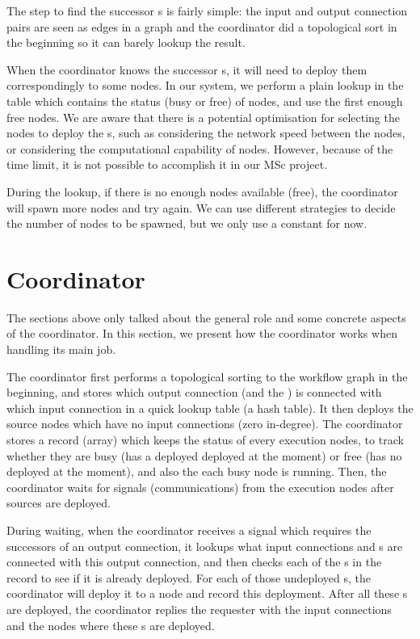 The step to find the successor \tPEInst{}s is fairly simple: the input and output connection pairs are seen as edges in a graph and the coordinator did a topological sort in the beginning so it can barely lookup the result.

When the coordinator knows the successor \tPEInst{}s, it will need to deploy them correspondingly to some nodes. In our system, we perform a plain lookup in the table which contains the status (busy or free) of nodes, and use the first enough free nodes. We are aware that there is a potential optimisation for selecting the nodes to deploy the \tPEInst{}s, such as considering the network speed between the nodes, or considering the computational capability of nodes. However, because of the time limit, it is not possible to accomplish it in our MSc project.

During the lookup, if there is no enough nodes available (free), the coordinator will spawn more nodes and try again. We can use different strategies to decide the number of nodes to be spawned, but we only use a constant for now.

\section{Coordinator}
The sections above only talked about the general role and some concrete aspects of the coordinator. In this section, we present how the coordinator works when handling its main job.

The coordinator first performs a topological sorting to the workflow graph in the beginning, and stores which output connection (and the \tPEInst) is connected with which input connection in a quick lookup table (\eg a hash table). It then deploys the source nodes which have no input connections (\ie zero in-degree). The coordinator stores a record (array) which keeps the status of every execution nodes, to track whether they are busy (has a \tPEInst deployed deployed at the moment) or free (has no \tPEInst deployed at the moment), and also the \tPEInst each busy node is running.
Then, the coordinator waits for signals (\ie communications) from the execution nodes after sources are deployed.

During waiting, when the coordinator receives a signal which requires the successors of an output connection, it lookups what input connections and \tPEInst{}s are connected with this output connection, and then checks each of the \tPEInst{}s in the record to see if it is already deployed. For each of those undeployed \tPEInst{}s, the coordinator will deploy it to a node and record this deployment. After all these \tPEInst{}s are deployed, the coordinator replies the requester with the input connections and the nodes where these \tPEInst{}s are deployed.

